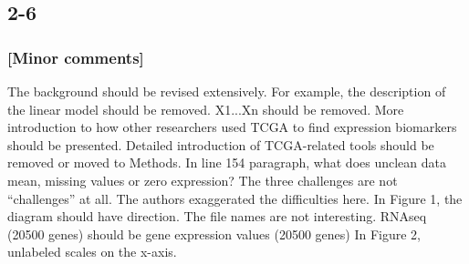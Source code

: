 \documentclass[preprint,12pt]{elsarticle}
\newenvironment{MyColorPar}[1]{%
    \leavevmode\color{#1}\ignorespaces%
}{%
}%
\begin{document}
\begin{MyColorPar}{blue}
 


\end{MyColorPar}
%
\clearpage

\subsection*{2-6}
\subsubsection*{[Minor comments]}
The background should be revised extensively. For example, the description of the linear model should be removed. X1...Xn should be removed. 
More introduction to how other researchers used TCGA to find expression biomarkers should be presented. 
Detailed introduction of TCGA-related tools should be removed or moved to Methods.
In line 154 paragraph, what does unclean data mean, missing values or zero expression? The three challenges are not “challenges” at all. The authors exaggerated the difficulties here.
In Figure 1, the diagram should have direction. 
The file names are not interesting. RNAseq (20500 genes) should be gene expression values (20500 genes)
In Figure 2, unlabeled scales on the x-axis.
\end{document}
